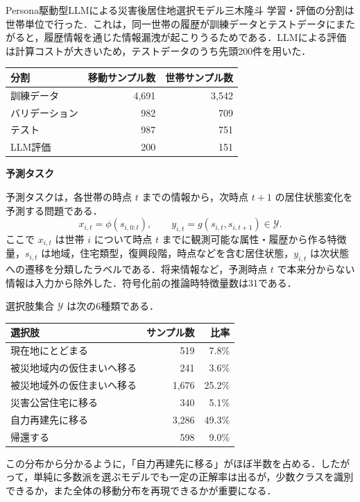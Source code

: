 \begin{column}{Persona駆動型LLMによる災害後居住地選択モデル}{三木隆斗}
学習・評価の分割は世帯単位で行った．これは，同一世帯の履歴が訓練データとテストデータにまたがると，履歴情報を通じた情報漏洩が起こりうるためである．LLMによる評価は計算コストが大きいため，テストデータのうち先頭200件を用いた．

\begin{center}
\scriptsize
\begin{tabular}{lrr}
\toprule
分割 & 移動サンプル数 & 世帯サンプル数 \\
\midrule
訓練データ & 4,691 & 3,542 \\
バリデーション & 982 & 709 \\
テスト & 987 & 751 \\
LLM評価 & 200 & 151 \\
\bottomrule
\end{tabular}
\end{center}

\medskip
\noindent
\textbf{予測タスク}

予測タスクは，各世帯の時点 \(t\) までの情報から，次時点 \(t+1\) の居住状態変化を予測する問題である．
\begin{equation}
x_{i,t}=\phi(s_{i,0:t}), \qquad
y_{i,t}=g(s_{i,t},s_{i,t+1}) \in \mathcal{Y}.
\end{equation}
ここで \(x_{i,t}\) は世帯 \(i\) について時点 \(t\) までに観測可能な属性・履歴から作る特徴量，\(s_{i,t}\) は地域，住宅類型，復興段階，時点などを含む居住状態，\(y_{i,t}\) は次状態への遷移を分類したラベルである．将来情報など，予測時点 \(t\) で本来分からない情報は入力から除外した．符号化前の推論時特徴量数は31である．

選択肢集合 \(\mathcal{Y}\) は次の6種類である．

\begin{center}
\scriptsize
\begin{tabular}{lrr}
\toprule
選択肢 & サンプル数 & 比率 \\
\midrule
現在地にとどまる & 519 & 7.8\% \\
被災地域内の仮住まいへ移る & 241 & 3.6\% \\
被災地域外の仮住まいへ移る & 1,676 & 25.2\% \\
災害公営住宅に移る & 340 & 5.1\% \\
自力再建先に移る & 3,286 & 49.3\% \\
帰還する & 598 & 9.0\% \\
\bottomrule
\end{tabular}
\end{center}

この分布から分かるように，「自力再建先に移る」がほぼ半数を占める．したがって，単純に多数派を選ぶモデルでも一定の正解率は出るが，少数クラスを識別できるか，また全体の移動分布を再現できるかが重要になる．


\end{column}
